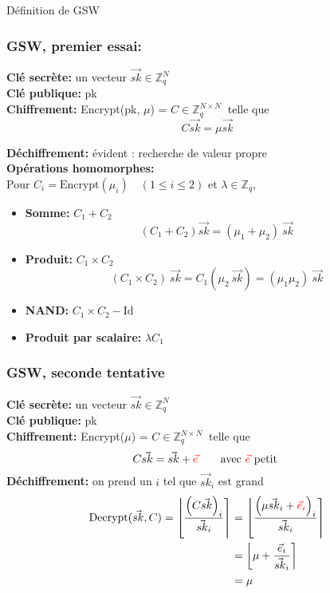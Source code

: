 \documentclass[10pt,xcolor={usenames,dvipsnames}]{beamer}
\newcommand{\ZZq}{\mathbb{Z}_q}
\begin{document}
\begin{section}{Définition de GSW}

\begin{frame} 
\frametitle{GSW, premier essai:}
\textbf{Clé secrète:} un vecteur $\vec{sk} \in \ZZq^{N}$ \\
\textbf{Clé publique:} pk\\
\textbf{Chiffrement:} Encrypt(pk, $\mu$) = $C\in \ZZq^{N \times N}\:$ telle que  
\[C \vec{sk} = \mu\vec{sk}\]
\vspace{-1cm}

\textbf{Déchiffrement:} évident : recherche de valeur propre \\
\textbf{Opérations homomorphes:}\\
Pour {\small$C_i = \text{Encrypt}(\mu_i) \quad(1 \leqslant i \leqslant 2)$}
et $\lambda \in \ZZq$,
\begin{itemize}
\item \textbf{Somme:} $C_1 + C_2\quad$
\[\left(C_1 + C_2\right) \vec{sk} = (\mu_1 + \mu_2)\: \vec{sk}\]
\item \textbf{Produit:} $C_1 \times C_2\quad$
\[\left(C_1 \times C_2\right)\: \vec{sk} = C_1\left(\mu_2\:\vec{sk}\right) = (\mu_1 \mu_2)\:\vec{sk}\]
\item \textbf{NAND:} $C_1 \times C_2 - \text{Id}$
\item \textbf{Produit par scalaire:} $\lambda C_1\quad$
\end{itemize}
\end{frame} 


\begin{frame} 
\frametitle{GSW, seconde tentative}
\textbf{Clé secrète:} un vecteur $\vec{sk} \in \ZZq^{N}$ \\
\textbf{Clé publique:} pk\\
\textbf{Chiffrement:} Encrypt($\mu$) = $C\in \ZZq^{N \times N}\:$ telle que  
\[C \vec{sk} = \vec{sk} + {\color{red}\vec{e}}\qquad \text{avec }  {\color{red}\vec{e}} \text{ petit} \]
\textbf{Déchiffrement:} on prend un $i$ tel que $\vec{sk}_i$ est grand
\begin{align*}
\text{Decrypt}(\vec{sk}, C) = \left\lfloor \frac{{\left(C\vec{sk}\right)}_i}{\vec{sk}_i} \right\rceil &= 
\left\lfloor \frac{{\left(\mu\vec{sk}_i + {\color{red}\vec{e}_i}\right)}_i}{\vec{sk}_i} \right\rceil \\
&= \left\lfloor \mu + \frac{\vec{e}_i}{\vec{sk}_i} \right\rceil \\
&= \mu
\end{align*}
\end{frame} 


\end{section}
\end{document}
